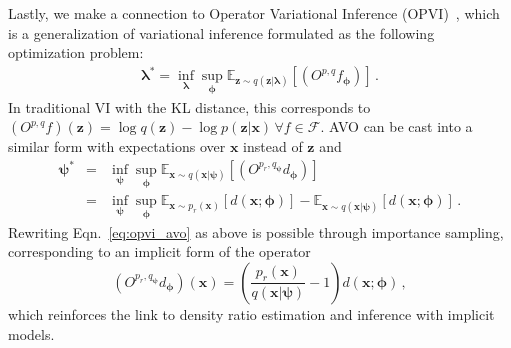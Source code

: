 \documentclass[twocolumn,superscriptaddress,aps]{revtex4-1}
\newcommand{\bfpsi}{{\bm \psi}}
\newcommand{\bfphi}{{\bm \phi}}
\newcommand{\bflambda}{{\bm \lambda}}
\newcommand{\bfx}{\mathbf{x}}
\newcommand{\bfz}{\mathbf{z}}
\theoremstyle{plain}
\begin{document}

Lastly, we make a connection to Operator Variational Inference (OPVI)~\citep{2016arXiv161009033R},
which is a generalization of variational inference formulated as the following optimization problem:
\begin{eqnarray}
\bflambda^* = \inf_\bflambda \sup_\bfphi \mathbb{E}_{ \bfz \sim q( \bfz | \bflambda)} [ (O^{p,q} f_\bfphi) ] \, .
\end{eqnarray}
In traditional VI with the KL distance, this corresponds to $(O^{p,q} f)(\bfz) = \log q(\bfz) - \log p(\bfz|\bfx) \, \forall f \in \mathcal{F}$.
AVO can be cast into a similar form with expectations over $\bfx$ instead of $\bfz$ and
\begin{eqnarray} \label{eq:opvi_avo}
\bfpsi^* &=& \inf_\bfpsi \sup_\bfphi \mathbb{E}_{ \bfx \sim q( \bfx | \bfpsi)} [ (O^{p_r,q_\bfpsi} d_\bfphi) ] \\
\label{eq:opvi_avo2} &=&  \inf_\bfpsi \sup_\bfphi \mathbb{E}_{\bfx\sim p_r(\bfx)}[d(\bfx; \bfphi)] - \mathbb{E}_{\bfx \sim q(\bfx|\bfpsi)}[d(\bfx; \bfphi)] \nonumber \, .
\end{eqnarray}
Rewriting Eqn.~\ref{eq:opvi_avo} as above is possible through importance sampling,
corresponding to an implicit form of the operator
\begin{equation}
(O^{p_r,q_\bfpsi} d_\bfphi)(\bfx) = \left( \frac{p_r(\bfx)}{q(\bfx|\bfpsi)}  -1 \right) d(\bfx; \bfphi) \, ,
\end{equation}
which reinforces the link to density ratio estimation and inference with implicit models.
\end{document}
